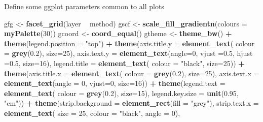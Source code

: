 \documentclass[]{book}
\newenvironment{Shaded}{\begin{snugshade}}{\end{snugshade}}
\newcommand{\DataTypeTok}[1]{\textcolor[rgb]{0.13,0.29,0.53}{#1}}
\newcommand{\DecValTok}[1]{\textcolor[rgb]{0.00,0.00,0.81}{#1}}
\newcommand{\FloatTok}[1]{\textcolor[rgb]{0.00,0.00,0.81}{#1}}
\newcommand{\KeywordTok}[1]{\textcolor[rgb]{0.13,0.29,0.53}{\textbf{#1}}}
\newcommand{\NormalTok}[1]{#1}
\newcommand{\OperatorTok}[1]{\textcolor[rgb]{0.81,0.36,0.00}{\textbf{#1}}}
\newcommand{\StringTok}[1]{\textcolor[rgb]{0.31,0.60,0.02}{#1}}
\begin{document}
Define some ggplot parameters common to all plots

\begin{Shaded}
\begin{Highlighting}[]
\NormalTok{gfg <-}\StringTok{ }\KeywordTok{facet_grid}\NormalTok{(layer }\OperatorTok{~}\StringTok{ }\NormalTok{method)}
\NormalTok{gscf <-}\StringTok{ }\KeywordTok{scale_fill_gradientn}\NormalTok{(}\DataTypeTok{colours =} \KeywordTok{myPalette}\NormalTok{(}\DecValTok{30}\NormalTok{))}
\NormalTok{gcoord <-}\StringTok{ }\KeywordTok{coord_equal}\NormalTok{() }
\NormalTok{gtheme <-}\StringTok{ }\KeywordTok{theme_bw}\NormalTok{() }\OperatorTok{+}\StringTok{ }
\StringTok{  }\KeywordTok{theme}\NormalTok{(}\DataTypeTok{legend.position =} \StringTok{"top"}\NormalTok{) }\OperatorTok{+}\StringTok{ }
\StringTok{  }\KeywordTok{theme}\NormalTok{(}\DataTypeTok{axis.title.y =} \KeywordTok{element_text}\NormalTok{( }\DataTypeTok{colour =} \KeywordTok{grey}\NormalTok{(}\FloatTok{0.2}\NormalTok{), }\DataTypeTok{size=}\DecValTok{25}\NormalTok{),}
        \DataTypeTok{axis.text.y  =} \KeywordTok{element_text}\NormalTok{(}\DataTypeTok{angle=}\DecValTok{0}\NormalTok{, }\DataTypeTok{vjust =}\FloatTok{0.5}\NormalTok{, }\DataTypeTok{hjust =}\FloatTok{0.5}\NormalTok{, }\DataTypeTok{size=}\DecValTok{16}\NormalTok{), }
        \DataTypeTok{legend.title =} \KeywordTok{element_text}\NormalTok{( }\DataTypeTok{colour =} \StringTok{"black"}\NormalTok{, }\DataTypeTok{size=}\DecValTok{25}\NormalTok{)) }\OperatorTok{+}
\StringTok{  }\KeywordTok{theme}\NormalTok{(}\DataTypeTok{axis.title.x =} \KeywordTok{element_text}\NormalTok{( }\DataTypeTok{colour =} \KeywordTok{grey}\NormalTok{(}\FloatTok{0.2}\NormalTok{), }\DataTypeTok{size=}\DecValTok{25}\NormalTok{),}
        \DataTypeTok{axis.text.x  =} \KeywordTok{element_text}\NormalTok{(}\DataTypeTok{angle =} \DecValTok{0}\NormalTok{, }\DataTypeTok{vjust=}\DecValTok{0}\NormalTok{, }\DataTypeTok{size=}\DecValTok{16}\NormalTok{)) }\OperatorTok{+}
\StringTok{  }\KeywordTok{theme}\NormalTok{(}\DataTypeTok{legend.text =} \KeywordTok{element_text}\NormalTok{( }\DataTypeTok{colour =} \KeywordTok{grey}\NormalTok{(}\FloatTok{0.2}\NormalTok{), }\DataTypeTok{size=}\DecValTok{15}\NormalTok{),}
        \DataTypeTok{legend.key.size =} \KeywordTok{unit}\NormalTok{(}\FloatTok{0.95}\NormalTok{, }\StringTok{"cm"}\NormalTok{)) }\OperatorTok{+}
\StringTok{  }\KeywordTok{theme}\NormalTok{(}\DataTypeTok{strip.background =} \KeywordTok{element_rect}\NormalTok{(}\DataTypeTok{fill =} \StringTok{"grey"}\NormalTok{), }
        \DataTypeTok{strip.text.x =} \KeywordTok{element_text}\NormalTok{( }\DataTypeTok{size =} \DecValTok{25}\NormalTok{, }\DataTypeTok{colour =} \StringTok{"black"}\NormalTok{, }\DataTypeTok{angle =} \DecValTok{0}\NormalTok{),}

\end{Highlighting}
\end{Shaded}
\end{document}
